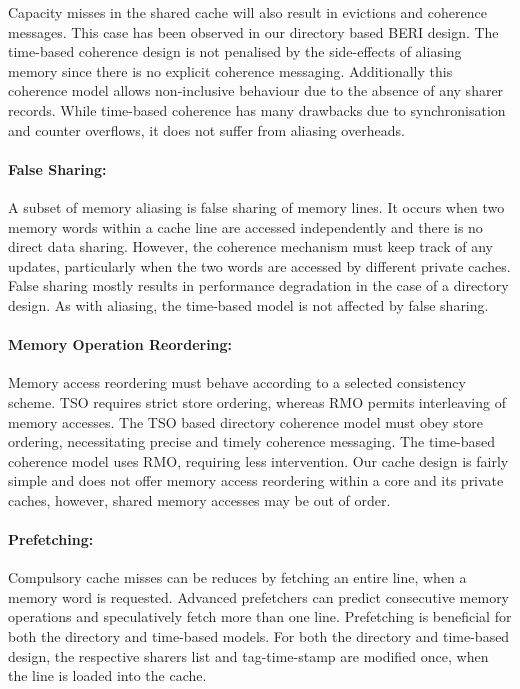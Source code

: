 	Capacity misses in the shared cache will also result in evictions and coherence messages. This case has been observed in our directory based BERI design. The time-based coherence design is not penalised by the side-effects of aliasing memory since there is no explicit coherence messaging. Additionally this coherence model allows non-inclusive behaviour due to the absence of any sharer records. While time-based coherence has many drawbacks due to synchronisation and counter overflows, it does not suffer from aliasing overheads.
	
	\paragraph{False Sharing:} A subset of memory aliasing is false sharing of memory lines. It occurs when two memory words within a cache line are accessed independently and there is no direct data sharing. However, the coherence mechanism must keep track of any updates, particularly when the two words are accessed by different private caches. False sharing mostly results in performance degradation in the case of a directory design. As with aliasing, the time-based model is not affected by false sharing.
	
	\paragraph{Memory Operation Reordering:} Memory access reordering must behave according to a selected consistency scheme. TSO requires strict store ordering, whereas RMO permits interleaving of memory accesses. The TSO based directory coherence model must obey store ordering, necessitating precise and timely coherence messaging. The time-based coherence model uses RMO, requiring less intervention. Our cache design is fairly simple and does not offer memory access reordering within a core and its private caches, however, shared memory accesses may be out of order.
	
	\paragraph{Prefetching:} Compulsory cache misses can be reduces by fetching an entire line, when a memory word is requested. Advanced prefetchers can predict consecutive memory operations and speculatively fetch more than one line. Prefetching is beneficial for both the directory and time-based models. For both the directory and time-based design, the respective sharers list and tag-time-stamp are modified once, when the line is loaded into the cache.
	
